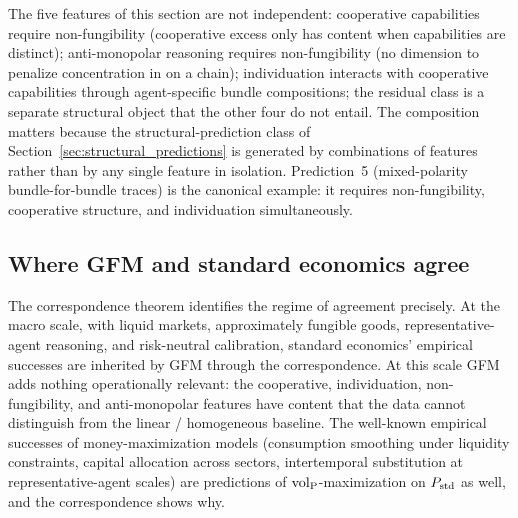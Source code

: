\begin{remark}
\label{rem:features_compose}
The five features of this section are not independent: cooperative
capabilities require non-fungibility (cooperative excess only has
content when capabilities are distinct); anti-monopolar reasoning
requires non-fungibility (no dimension to penalize concentration in
on a chain); individuation interacts with cooperative capabilities
through agent-specific bundle compositions; the residual class is
a separate structural object that the other four do not entail.
The composition matters because the structural-prediction class of
Section~\ref{sec:structural_predictions} is generated by
combinations of features rather than by any single feature in
isolation.  Prediction~5 (mixed-polarity bundle-for-bundle traces)
is the canonical example: it requires non-fungibility, cooperative
structure, and individuation simultaneously.
\end{remark}

\subsection{Where GFM and standard economics agree}
\label{sec:fc_agreement}

The correspondence theorem identifies the regime of agreement
precisely.  At the macro scale, with liquid markets, approximately
fungible goods, representative-agent reasoning, and risk-neutral
calibration, standard economics' empirical successes are
inherited by GFM through the correspondence.  At this scale GFM
adds nothing operationally relevant: the cooperative, individuation,
non-fungibility, and anti-monopolar features have content that the
data cannot distinguish from the linear / homogeneous baseline.
The well-known empirical successes of money-maximization
models (consumption smoothing under liquidity constraints,
capital allocation across sectors, intertemporal substitution at
representative-agent scales) are predictions of ${\operatorname{vol}_{\mathrm{P}}}$-maximization
on $P_{\mathrm{std}}$ as well, and the correspondence shows why.


